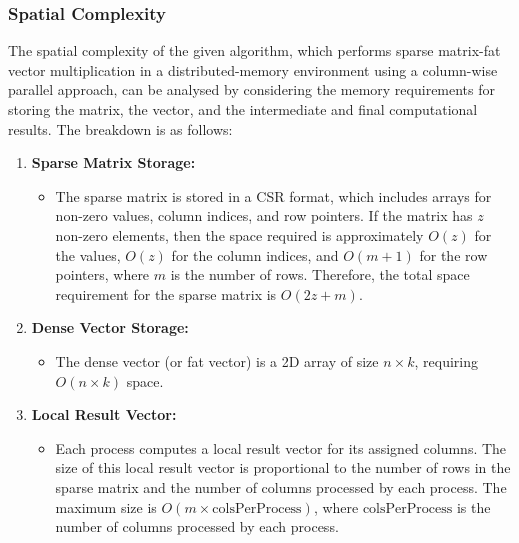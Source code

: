 \documentclass[12pt,oneside]{book} %
\begin{document}
\subsubsection{Spatial Complexity}
The spatial complexity of the given algorithm, which performs sparse matrix-fat
vector multiplication in a distributed-memory environment using a column-wise
parallel approach, can be analysed by considering the memory requirements for
storing the matrix, the vector, and the intermediate and final computational
results. The breakdown is as follows:
\begin{enumerate}
    \item \textbf{Sparse Matrix Storage:}
          \begin{itemize}
              \item The sparse matrix is stored in a CSR format, which includes arrays for non-zero
                    values, column indices, and row pointers. If the matrix has \( z \) non-zero
                    elements, then the space required is approximately \( O(z) \) for the values,
                    \( O(z) \) for the column indices, and \( O(m + 1) \) for the row pointers,
                    where \( m \) is the number of rows. Therefore, the total space requirement for
                    the sparse matrix is \( O(2z + m) \).
          \end{itemize}

    \item \textbf{Dense Vector Storage:}
          \begin{itemize}
              \item The dense vector (or fat vector) is a 2D array of size \( n \times k \),
                    requiring \( O(n \times k) \) space.
          \end{itemize}

    \item \textbf{Local Result Vector:}
          \begin{itemize}
              \item Each process computes a local result vector for its assigned columns. The size
                    of this local result vector is proportional to the number of rows in the sparse
                    matrix and the number of columns processed by each process. The maximum size is
                    \( O(m \times \text{colsPerProcess}) \), where \(\text{colsPerProcess}\) is the
                    number of columns processed by each process.
          \end{itemize}


\end{enumerate}
\end{document}
